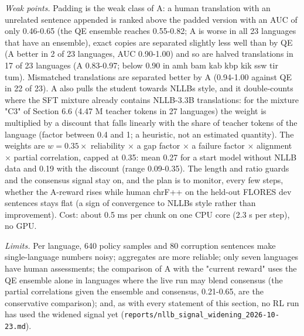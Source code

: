\emph{Weak points.} Padding is the weak class of A: a human translation with an unrelated sentence appended is ranked above the padded version with an AUC of only 0.46-0.65 (the QE ensemble reaches 0.55-0.82; A is worse in all 23 languages that have an ensemble), exact copies are separated slightly less well than by QE (A better in 2 of 23 languages, AUC 0.90-1.00) and so are halved translations in 17 of 23 languages (A 0.83-0.97; below 0.90 in amh bam kab kbp kik ssw tir tum). Mismatched translations are separated better by A (0.94-1.00 against QE in 22 of 23). A also pulls the student towards NLLB\textquotesingle s style, and it double-counts where the SFT mixture already contains NLLB-3.3B translations: for the mixture "C3" of Section 6.6 (4.47 M teacher tokens in 27 languages) the weight is multiplied by a discount that falls linearly with the share of teacher tokens of the language (factor between 0.4 and 1; a heuristic, not an estimated quantity). The weights are \(w=0.35\times\) reliability \(\times\) a gap factor \(\times\) a failure factor \(\times\) alignment \(\times\) partial correlation, capped at 0.35: mean 0.27 for a start model without NLLB data and 0.19 with the discount (range 0.09-0.35). The length and ratio guards and the consensus signal stay on, and the plan is to monitor, every few steps, whether the A-reward rises while human chrF++ on the held-out FLORES dev sentences stays flat (a sign of convergence to NLLB\textquotesingle s style rather than improvement). Cost: about 0.5 ms per chunk on one CPU core (2.3 s per step), no GPU.

\emph{Limits.} Per language, 640 policy samples and 80 corruption sentences make single-language numbers noisy; aggregates are more reliable; only seven languages have human assessments; the comparison of A with the "current reward" uses the QE ensemble alone in languages where the live run may blend consensus (the partial correlations given the ensemble and consensus, 0.21-0.65, are the conservative comparison); and, as with every statement of this section, no RL run has used the widened signal yet (\texttt{reports/nllb\_signal\_widening\_2026-10-23.md}).

